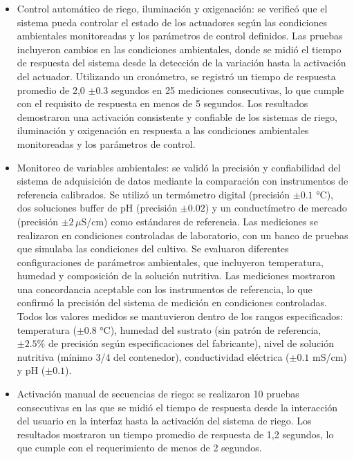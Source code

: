 \begin{itemize}
    \item Control automático de riego, iluminación y oxigenación: se verificó que el sistema pueda controlar el estado de los actuadores según las condiciones ambientales monitoreadas y los parámetros de control definidos. Las pruebas incluyeron cambios en las condiciones ambientales, donde se midió el tiempo de respuesta del sistema desde la detección de la variación hasta la activación del actuador. Utilizando un cronómetro, se registró un tiempo de respuesta promedio de 2,0 $\pm 0.3$ segundos en 25 mediciones consecutivas, lo que cumple con el requisito de respuesta en menos de 5 segundos. Los resultados demostraron una activación consistente y confiable de los sistemas de riego, iluminación y oxigenación en respuesta a las condiciones ambientales monitoreadas y los parámetros de control.
    
    \item Monitoreo de variables ambientales: se validó la precisión y confiabilidad del sistema de adquisición de datos mediante la comparación con instrumentos de referencia calibrados. Se utilizó un termómetro digital (precisión $\pm 0.1$ °C), dos soluciones buffer de pH (precisión $\pm 0.02$) y un conductímetro de mercado (precisión $\pm 2\,\mu$S/cm) como estándares de referencia. Las mediciones se realizaron en condiciones controladas de laboratorio, con un banco de pruebas que simulaba las condiciones del cultivo. Se evaluaron diferentes configuraciones de parámetros ambientales, que incluyeron temperatura, humedad y composición de la solución nutritiva. Las mediciones mostraron una concordancia aceptable con los instrumentos de referencia, lo que confirmó la precisión del sistema de medición en condiciones controladas. Todos los valores medidos se mantuvieron dentro de los rangos especificados: temperatura ($\pm 0.8$ °C), humedad del sustrato (sin patrón de referencia, $\pm 2.5 \%$ de precisión según especificaciones del fabricante), nivel de solución nutritiva (mínimo 3/4 del contenedor), conductividad eléctrica ($\pm 0.1$ mS/cm) y pH ($\pm 0.1$).
    
    \item Activación manual de secuencias de riego: se realizaron 10 pruebas consecutivas en las que se midió el tiempo de respuesta desde la interacción del usuario en la interfaz hasta la activación del sistema de riego. Los resultados mostraron un tiempo promedio de respuesta de 1,2 segundos, lo que cumple con el requerimiento de menos de 2 segundos.
    

\end{itemize}
